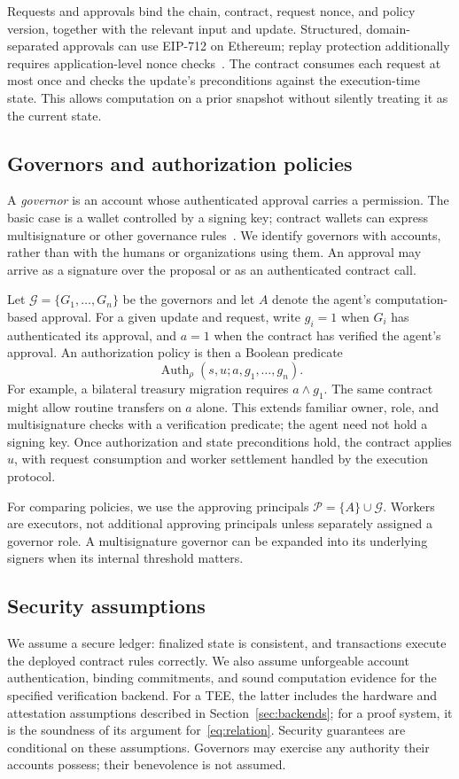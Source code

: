 \documentclass[10pt,letterpaper]{article}
\newcommand{\G}{\mathcal G}
\newcommand{\Pset}{\mathcal P}
\newcommand{\Auth}{\operatorname{Auth}}
\begin{document}
Requests and approvals bind the chain, contract, request nonce, and policy version, together with the relevant input and update. Structured, domain-separated approvals can use EIP-712 on Ethereum; replay protection additionally requires application-level nonce checks~\citep{eip712}. The contract consumes each request at most once and checks the update's preconditions against the execution-time state. This allows computation on a prior snapshot without silently treating it as the current state.

\subsection{Governors and authorization policies}
A \emph{governor} is an account whose authenticated approval carries a permission. The basic case is a wallet controlled by a signing key; contract wallets can express multisignature or other governance rules~\citep{ethereumaccounts,openzeppelinaccess}. We identify governors with accounts, rather than with the humans or organizations using them. An approval may arrive as a signature over the proposal or as an authenticated contract call.

Let $\G=\{G_1,\ldots,G_n\}$ be the governors and let $A$ denote the agent's computation-based approval. For a given update and request, write $g_i=1$ when $G_i$ has authenticated its approval, and $a=1$ when the contract has verified the agent's approval. An authorization policy is then a Boolean predicate
\[
 \Auth_\rho(s,u;a,g_1,\ldots,g_n).
\]
For example, a bilateral treasury migration requires $a\land g_1$. The same contract might allow routine transfers on $a$ alone. This extends familiar owner, role, and multisignature checks with a verification predicate; the agent need not hold a signing key. Once authorization and state preconditions hold, the contract applies $u$, with request consumption and worker settlement handled by the execution protocol.

For comparing policies, we use the approving principals $\Pset=\{A\}\cup\G$. Workers are executors, not additional approving principals unless separately assigned a governor role. A multisignature governor can be expanded into its underlying signers when its internal threshold matters.

\subsection{Security assumptions}
We assume a secure ledger: finalized state is consistent, and transactions execute the deployed contract rules correctly. We also assume unforgeable account authentication, binding commitments, and sound computation evidence for the specified verification backend. For a TEE, the latter includes the hardware and attestation assumptions described in Section~\ref{sec:backends}; for a proof system, it is the soundness of its argument for~\eqref{eq:relation}. Security guarantees are conditional on these assumptions. Governors may exercise any authority their accounts possess; their benevolence is not assumed.
\end{document}
